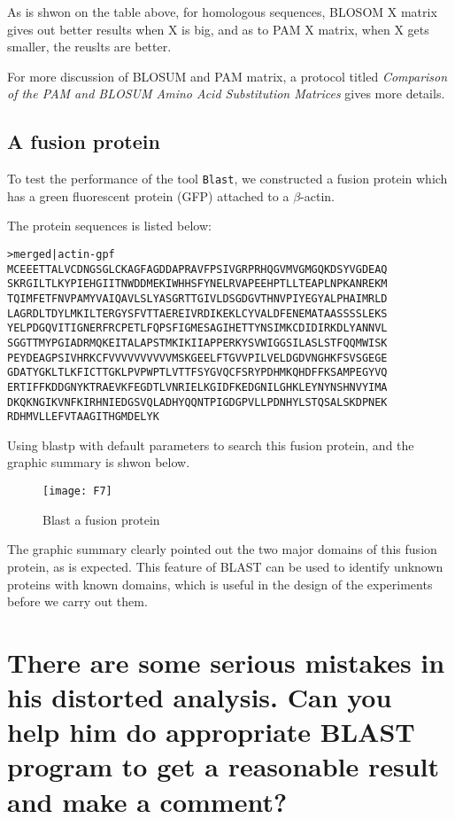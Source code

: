 \documentclass[en,black,10pt,normal]{elegantnote}
\newcommand{\upcite}[1]{\textsuperscript{\textsuperscript{\cite{#1}}}}
\begin{document}
As is shwon on the table above, for homologous sequences, BLOSOM X matrix gives out better results when X is big,
and as to PAM X matrix, when X gets smaller, the reuslts are better.

For more discussion of BLOSUM and PAM matrix, a protocol titled \textit{Comparison of the PAM and BLOSUM Amino Acid Substitution Matrices} gives more details.\upcite{mount_comparison_2008}

\subsection{A fusion protein}

To test the performance of the tool \texttt{Blast}, we constructed 
a fusion protein which has a green fluorescent protein (GFP) attached to a $\beta$-actin.

The protein sequences is listed below:
\begin{lstlisting}[frame=single]
>merged|actin-gpf
MCEEETTALVCDNGSGLCKAGFAGDDAPRAVFPSIVGRPRHQGVMVGMGQKDSYVGDEAQ
SKRGILTLKYPIEHGIITNWDDMEKIWHHSFYNELRVAPEEHPTLLTEAPLNPKANREKM
TQIMFETFNVPAMYVAIQAVLSLYASGRTTGIVLDSGDGVTHNVPIYEGYALPHAIMRLD
LAGRDLTDYLMKILTERGYSFVTTAEREIVRDIKEKLCYVALDFENEMATAASSSSLEKS
YELPDGQVITIGNERFRCPETLFQPSFIGMESAGIHETTYNSIMKCDIDIRKDLYANNVL
SGGTTMYPGIADRMQKEITALAPSTMKIKIIAPPERKYSVWIGGSILASLSTFQQMWISK
PEYDEAGPSIVHRKCFVVVVVVVVVVMSKGEELFTGVVPILVELDGDVNGHKFSVSGEGE
GDATYGKLTLKFICTTGKLPVPWPTLVTTFSYGVQCFSRYPDHMKQHDFFKSAMPEGYVQ
ERTIFFKDDGNYKTRAEVKFEGDTLVNRIELKGIDFKEDGNILGHKLEYNYNSHNVYIMA
DKQKNGIKVNFKIRHNIEDGSVQLADHYQQNTPIGDGPVLLPDNHYLSTQSALSKDPNEK
RDHMVLLEFVTAAGITHGMDELYK
\end{lstlisting}

Using blastp with default parameters to search this fusion protein, 
and the graphic summary is shwon below.

\begin{figure}[H]
    \centering
    \texttt{[image: F7]}
    \caption{Blast a fusion protein}
    \label{F7}
\end{figure}

The graphic summary clearly pointed out the two major domains of this fusion protein,
as is expected. 
This feature of BLAST can be used to identify unknown proteins with known domains, 
which is useful in the design of the experiments before we carry out them.


\section{There are some serious mistakes in his distorted analysis. Can you help him do appropriate BLAST program to get a reasonable result and make a comment?}
\end{document}

